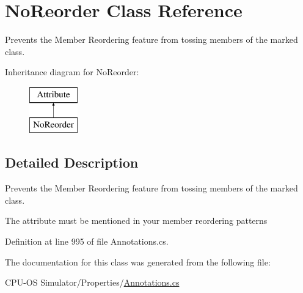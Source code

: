 \hypertarget{class_no_reorder}{}\section{No\+Reorder Class Reference}
\label{class_no_reorder}


Prevents the Member Reordering feature from tossing members of the marked class.  


Inheritance diagram for No\+Reorder\+:\begin{figure}[H]
\begin{center}
\leavevmode
\includegraphics[height=2.000000cm]{class_no_reorder}
\end{center}
\end{figure}


\subsection{Detailed Description}
Prevents the Member Reordering feature from tossing members of the marked class. 

The attribute must be mentioned in your member reordering patterns 

Definition at line 995 of file Annotations.\+cs.



The documentation for this class was generated from the following file\+:\begin{DoxyCompactItemize}
\item 
C\+P\+U-\/\+O\+S Simulator/\+Properties/\hyperlink{_annotations_8cs}{Annotations.\+cs}\end{DoxyCompactItemize}
